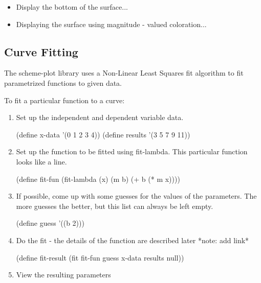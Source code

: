 \documentclass{article}
\begin{document}
{\begin{itemize}
\begin{itemize}
\item Display the bottom of the surface...
\item Displaying the surface using magnitude - valued coloration...
\end{itemize}



\end{itemize}


\subsection{Curve Fitting}

\label{Curve Fitting}


The scheme-plot library uses a Non-Linear Least Squares fit algorithm 
       to fit parametrized functions to given data.


To fit a particular function to a curve:\begin{enumerate}
\item Set up the independent and dependent variable data.
\begin{schemedisplay}

(define x-data '(0 1 2 3 4))
(define results '(3 5 7 9 11))
\end{schemedisplay}

\item Set up the function to be fitted using fit-lambda. This particular function
         looks like a line.
\begin{schemedisplay}

(define fit-fun 
 (fit-lambda (x) (m b) (+ b (* m x))))
\end{schemedisplay}

\item If possible, come up with some guesses for the values of the parameters.
         The more guesses the better, but this list can always be left empty.
\begin{schemedisplay}

(define guess '((b 2)))
\end{schemedisplay}

\item Do the fit - the details of the function are described later *note: add link*
\begin{schemedisplay}

(define fit-result (fit fit-fun guess x-data results null))
\end{schemedisplay}

\item View the resulting parameters
\begin{schemedisplay}


\end{schemedisplay}
\end{enumerate}}
\end{document}

